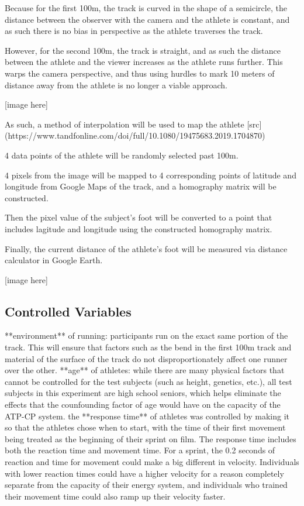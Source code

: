 \documentclass[index]{subfiles}
\begin{document}
Because for the first 100m, the track is curved in the shape of a semicircle, the distance between the observer with the camera and the athlete is constant, and as such there is no bias in perspective as the athlete traverses the track.

However, for the second 100m, the track is straight, and as such the distance between the athlete and the viewer increases as the athlete runs further. This warps the camera perspective, and thus using hurdles to mark 10 meters of distance away from the athlete is no longer a viable approach.

    [image here]

As such, a method of interpolation will be used to map the athlete [src](https://www.tandfonline.com/doi/full/10.1080/19475683.2019.1704870)


4 data points of the athlete will be randomly selected past 100m.

4 pixels from the image will be mapped to 4 corresponding points of latitude and longitude from Google Maps of the track, and a homography matrix will be constructed.

Then the pixel value of the subject's foot will be converted to a point that includes lagitude and longitude using the constructed homography matrix.

Finally, the current distance of the athlete's foot will be measured via distance calculator in Google Earth.

    [image here]

\subsection{Controlled Variables}
**environment** of running: participants run on the exact same portion of the track. This will ensure that factors such as the bend in the first 100m track and material of the surface of the track do not disproportionately affect one runner over the other.
**age** of athletes: while there are many physical factors that cannot be controlled for the test subjects (such as height, genetics, etc.), all test subjects in this experiment are high school seniors, which helps eliminate the effects that the counfounding factor of age would have on the capacity of the ATP-CP system.
the **response time** of athletes was controlled by making it so that the athletes chose when to start, with the time of their first movement being treated as the beginning of their sprint on film. The response time includes both the reaction time and movement time. For a sprint, the 0.2 seconds of reaction and time for movement could make a big different in velocity. Individuals with lower reaction times could have a higher velocity for a reason completely separate from the capacity of their energy system, and individuals who trained their movement time could also ramp up their velocity faster.
\end{document}
